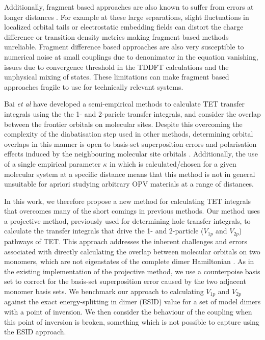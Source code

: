 \documentclass[aps,physrev,reprint,superscriptaddress,nofootinbib,amsmath,amssymb,a4paper]{revtex4-2}
\begin{document}
Additionally, fragment based approaches are also known to suffer from errors at longer distances \cite{Barcza2023, Bogo2024}. For example at these large separations, slight fluctuations in localized orbital tails or electrostatic embedding fields can distort the charge difference or transition density metrics making fragment based methods unreliable\cite{Voityuk2014}. Fragment difference based approaches are also very susceptible to numerical noise at small couplings \cite{Manian2023} due to denonimator in the equation vanishing, issues due to convergence threshold in the TDDFT calculations and the unphysical mixing of states. These limitations can make fragment based approaches fragile to use for technically relevant systems. 


Bai \textit{et al} have developed a semi-empirical methods \cite{Bai2020} to calculate TET transfer integrals using the the 1- and 2-paricle transfer integrals, and consider the overlap between the frontier orbitals on molecular sites. Despite this overcoming the complexity of the diabatisation step used in other methods, determining orbital overlaps in this manner is open to basis-set superposition errors and polarisation effects induced by the neighbouring molecular site orbitals \cite{Baumeier2010}. Additionally, the use of a single empirical parameter $\kappa$ in \cite{Bai2020} which is calculated/chosen for a given molecular system at a specific distance means that this method is not in general unsuitable for apriori studying arbitrary OPV materials  at a range of distances. 

In this work, we therefore propose a new method for calculating TET integrals that overcomes many of the short comings in previous methods. Our method uses a projective method, previously used for determining hole transfer integrals,  to calculate the transfer integrals that drive the 1- and 2-particle ($V_{1p}$ and $V_{2p}$) pathways of TET. This approach addresses the inherent challenges and errors associated with directly calculating the overlap between molecular orbitals on two monomers, which are not eigenstates of the complete dimer Hamiltonian \cite{Kirkpatrick2007}. As in the existing implementation of the projective method, we use a counterpoise basis set to correct for the basis-set superposition error caused by the two adjacent monomer basis sets\cite{Baumeier2010}. We benchmark our approach to calculating $V_{1p}$ and $V_{2p}$ against the exact energy-splitting in dimer (ESID) value for a set of model dimers with a point of inversion. We then consider the behaviour of the coupling when this point of inversion is broken, something which is not possible to capture using the ESID approach. 
\end{document}
